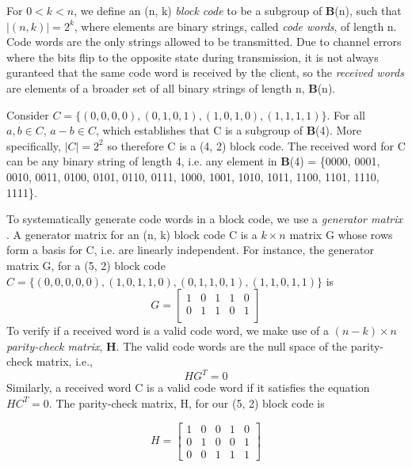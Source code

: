 \documentclass{article}
\begin{document}
For \(0 < k < n\), we define an (n, k) \textit{block code} to be a subgroup of \textbf{B}(n), such that
\(\lvert(n, k)\rvert = 2^k\), where elements are binary strings, called \textit{code words}, of 
length n. Code words are the only strings allowed to be transmitted. Due to channel errors where the 
bits flip to the opposite state during transmission, it is not always guranteed that the same code word
is received by the client, so the \textit{received words} are elements of a broader set of all binary 
strings of length n, \textbf{B}(n). 

Consider \(C = \{(0,0,0,0), (0,1,0,1), (1,0,1,0), (1,1,1,1)\}\). For all \(a, b \in C\),
\(a - b \in C\), which establishes that C is a subgroup of \textbf{B}(4). More specifically, \(|C| = 2^2\)
so therefore C is a (4, 2) block code. The received word for C can be any binary string of
length 4, i.e. any element in \textbf{B}(4) = \{0000, 0001, 0010, 0011, 0100, 0101, 0110, 0111, 1000,
1001, 1010, 1011, 1100, 1101, 1110, 1111\}.


To systematically generate code words in a block code, we use a \textit{generator matrix} 
\parencite{berlekamp1972survey}. A generator matrix for an (n, k) block code C is a \(k \times n\)
matrix G whose rows form a basis for C, i.e. are linearly independent. For instance, the generator
matrix G, for a (5, 2) block code \(C = \{(0,0,0,0,0), (1,0,1,1,0), (0,1,1,0,1), (1,1,0,1,1)\}\) is 
\[G = \begin{bmatrix} 
    1 & 0 & 1 & 1 & 0 \\
    0 & 1 & 1 & 0 & 1 \\
\end{bmatrix}\]
To verify if a received word is a valid code word, we make use of a \((n-k) \times n\) 
\textit{parity-check matrix}, \(\mathbf{H}\). The valid code words are the null space of the parity-check 
matrix, i.e., \[HG^T = 0\]
Similarly, a received word C is a valid code word if it satisfies the equation \( HC^T = 0 \).
The parity-check matrix, H, for our (5, 2) block code is

\[
H = \begin{bmatrix}
1 & 0 & 0 & 1 & 0 \\
0 & 1 & 0 & 0 & 1 \\
0 & 0 & 1 & 1 & 1
\end{bmatrix}\]
\end{document}
